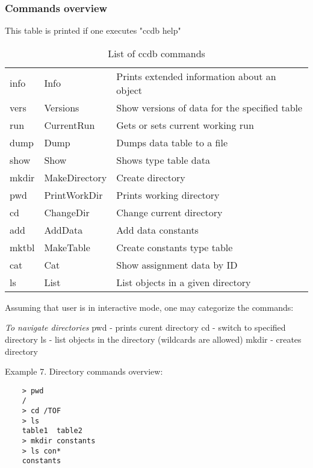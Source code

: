 \documentclass{article}
\begin{document}
\subsubsection{Commands overview}

This table is printed if one executes "ccdb help"
\begin{table}[position specifier]
\centering
\begin{tabular}{| l | l | l |}
  \hline
  info   & Info          & Prints extended information about an object \\
  vers   & Versions      & Show versions of data for the specified table \\
  run    & CurrentRun    & Gets or sets current working run \\
  dump   & Dump          & Dumps data table to a file \\
  show   & Show          & Shows type table data \\
  mkdir  & MakeDirectory & Create directory \\
  pwd    & PrintWorkDir  & Prints working directory \\
  cd     & ChangeDir     & Change current directory \\
  add    & AddData       & Add data constants \\
  mktbl  & MakeTable     & Create constants type table \\
  cat    & Cat           & Show assignment data by ID \\
  ls     & List          & List objects in a given directory \\
  \hline
\end{tabular}
\caption{List of ccdb commands}
\label{tab:commands}
\end{table}

Assuming that user is in interactive mode, one may categorize the commands:


\emph{To navigate directories}
pwd - prints curent directory
cd  - switch to specified directory
ls  - list objects in the directory (wildcards are allowed)
mkdir - creates directory

Example 7. Directory commands overview:
\begin{verbatim}
    > pwd
    /
	> cd /TOF
	> ls
    table1  table2
	> mkdir constants
	> ls con*
    constants
\end{verbatim}
\end{document}
